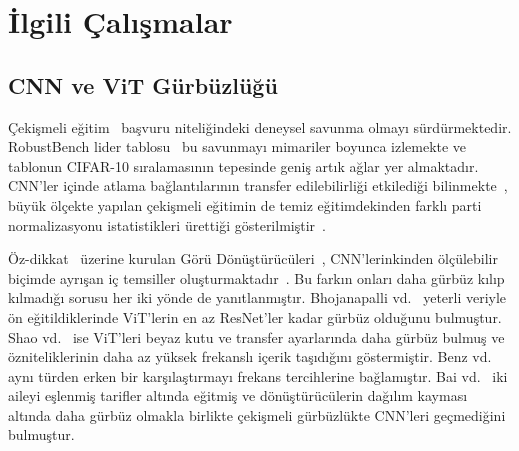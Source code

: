 \section{İlgili Çalışmalar}
\label{sec:related_work}

\subsection{CNN ve ViT Gürbüzlüğü}
\label{subsec:rw_robustness}

Çekişmeli eğitim~\cite{madry2018towards} başvuru niteliğindeki deneysel savunma olmayı sürdürmektedir. RobustBench lider tablosu~\cite{croce2021robustbench} bu savunmayı mimariler boyunca izlemekte ve tablonun CIFAR-10 sıralamasının tepesinde geniş artık ağlar yer almaktadır. CNN'ler içinde atlama bağlantılarının transfer edilebilirliği etkilediği bilinmekte~\cite{wu2020skip}, büyük ölçekte yapılan çekişmeli eğitimin de temiz eğitimdekinden farklı parti normalizasyonu istatistikleri ürettiği gösterilmiştir~\cite{xie2020intriguing}.

Öz-dikkat~\cite{vaswani2017attention} üzerine kurulan Görü Dönüştürücüleri~\cite{dosovitskiy2021image}, CNN'lerinkinden ölçülebilir biçimde ayrışan iç temsiller oluşturmaktadır~\cite{raghu2021vision}. Bu farkın onları daha gürbüz kılıp kılmadığı sorusu her iki yönde de yanıtlanmıştır. Bhojanapalli vd.~\cite{bhojanapalli2021understanding} yeterli veriyle ön eğitildiklerinde ViT'lerin en az ResNet'ler kadar gürbüz olduğunu bulmuştur. Shao vd.~\cite{shao2022adversarial} ise ViT'leri beyaz kutu ve transfer ayarlarında daha gürbüz bulmuş ve özniteliklerinin daha az yüksek frekanslı içerik taşıdığını göstermiştir. Benz vd.~\cite{benz2021adversarial} aynı türden erken bir karşılaştırmayı frekans tercihlerine bağlamıştır. Bai vd.~\cite{bai2021transformers} iki aileyi eşlenmiş tarifler altında eğitmiş ve dönüştürücülerin dağılım kayması altında daha gürbüz olmakla birlikte çekişmeli gürbüzlükte CNN'leri geçmediğini bulmuştur.

